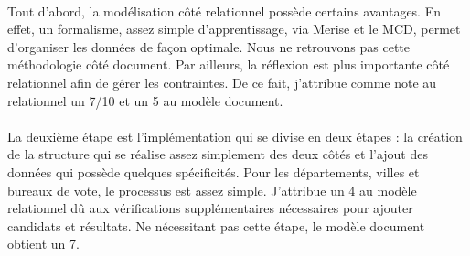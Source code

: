 \paragraph{}Tout d'abord, la modélisation côté relationnel possède certains avantages. En effet, un formalisme, assez simple d'apprentissage, via Merise et le  \acrfull{MCD}, permet d'organiser les données de façon optimale. Nous ne retrouvons pas cette méthodologie côté document. Par ailleurs, la réflexion est plus importante côté relationnel afin de gérer les contraintes. De ce fait, j'attribue comme note au relationnel un 7/10 et un 5 au modèle document.



\paragraph{}La deuxième étape est l'implémentation qui se divise en deux étapes : la création de la structure qui se réalise assez simplement des deux côtés et l'ajout des données qui possède quelques spécificités. Pour les départements, villes et bureaux de vote, le processus est assez simple. J'attribue un 4 au modèle relationnel dû aux vérifications supplémentaires nécessaires pour ajouter candidats et résultats. Ne nécessitant pas cette étape, le modèle document obtient un 7.


